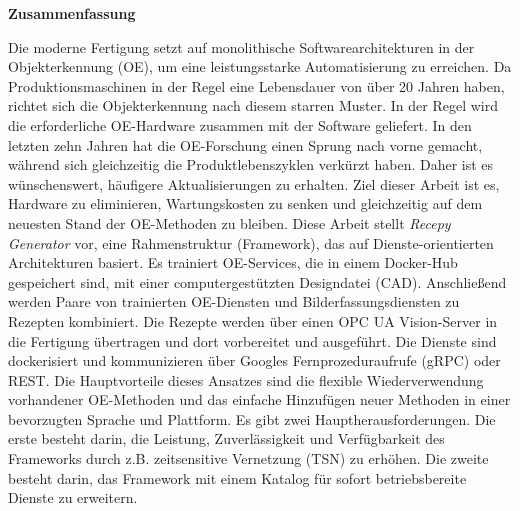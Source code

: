 \thispagestyle{empty}
\vspace*{1.0cm}

\begin{center}
    \textbf{Zusammenfassung}
\end{center}

\vspace*{0.5cm}

\noindent

Die moderne Fertigung setzt auf monolithische Softwarearchitekturen in der  Objekterkennung (OE), um eine leistungsstarke Automatisierung zu erreichen. Da Produktionsmaschinen in der Regel eine Lebensdauer von über 20 Jahren haben, richtet sich die Objekterkennung nach diesem starren Muster. In der Regel wird die erforderliche OE-Hardware zusammen mit der Software geliefert. In den letzten zehn Jahren hat die OE-Forschung einen Sprung nach vorne gemacht, während sich gleichzeitig die Produktlebenszyklen verkürzt haben. Daher ist es wünschenswert, häufigere Aktualisierungen zu erhalten. Ziel dieser Arbeit ist es, Hardware zu eliminieren, Wartungskosten zu senken und gleichzeitig auf dem neuesten Stand der OE-Methoden zu bleiben. Diese Arbeit stellt \textit{Recepy Generator} vor, eine Rahmenstruktur (Framework), das auf Dienste-orientierten Architekturen basiert. Es trainiert OE-Services, die in einem Docker-Hub gespeichert sind, mit einer computergestützten Designdatei (CAD). Anschließend werden Paare von trainierten OE-Diensten und Bilderfassungsdiensten zu Rezepten kombiniert. Die Rezepte werden über einen OPC UA Vision-Server in die Fertigung übertragen und dort vorbereitet und ausgeführt. Die Dienste sind dockerisiert und kommunizieren über Googles Fernprozeduraufrufe (gRPC) oder REST. Die Hauptvorteile dieses Ansatzes sind die flexible Wiederverwendung vorhandener OE-Methoden und das einfache Hinzufügen neuer Methoden in einer bevorzugten Sprache und Plattform. Es gibt zwei Hauptherausforderungen. Die erste besteht darin, die Leistung, Zuverlässigkeit und Verfügbarkeit des Frameworks durch z.B. zeitsensitive Vernetzung (TSN) zu erhöhen. Die zweite besteht darin, das Framework mit einem Katalog für sofort betriebsbereite Dienste zu erweitern.